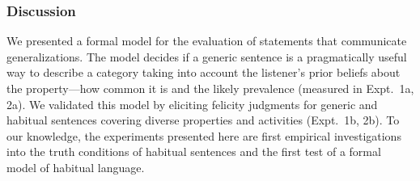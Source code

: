 \documentclass[11pt,letterpaper]{article}
\begin{document}


%
%
% 
 
\subsubsection*{Discussion}

We presented a formal model for the evaluation of statements that communicate generalizations.
The model decides if a generic sentence is a pragmatically useful way to describe a category taking into account the listener's prior beliefs about the property---how common it is and the likely prevalence (measured in Expt.~1a, 2a).
We validated this model by eliciting felicity judgments for generic and habitual sentences covering diverse properties and activities (Expt.~1b, 2b).
To our knowledge, the experiments presented here are first empirical investigations into the truth conditions of habitual sentences and the first test of a formal model of habitual language.
\end{document}
